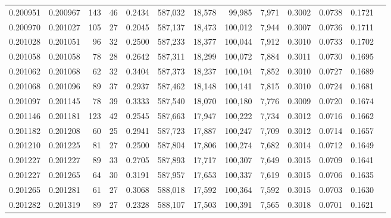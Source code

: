 \begin{tabular}{rrrrrrrrrrrrr}
0.200951 & 0.200967 &   143 &  46 &                                     0.2434 & 587,032 &  18,578 &  99,985 &   7,971 & 0.3002 & 0.0738 & 0.1721 \\
0.200970 & 0.201027 &   105 &  27 &                                     0.2045 & 587,137 &  18,473 & 100,012 &   7,944 & 0.3007 & 0.0736 & 0.1711 \\
0.201028 & 0.201051 &    96 &  32 &                                     0.2500 & 587,233 &  18,377 & 100,044 &   7,912 & 0.3010 & 0.0733 & 0.1702 \\
0.201058 & 0.201058 &    78 &  28 &                                     0.2642 & 587,311 &  18,299 & 100,072 &   7,884 & 0.3011 & 0.0730 & 0.1695 \\
0.201062 & 0.201068 &    62 &  32 &                                     0.3404 & 587,373 &  18,237 & 100,104 &   7,852 & 0.3010 & 0.0727 & 0.1689 \\
0.201068 & 0.201096 &    89 &  37 &                                     0.2937 & 587,462 &  18,148 & 100,141 &   7,815 & 0.3010 & 0.0724 & 0.1681 \\
0.201097 & 0.201145 &    78 &  39 &                                     0.3333 & 587,540 &  18,070 & 100,180 &   7,776 & 0.3009 & 0.0720 & 0.1674 \\
0.201146 & 0.201181 &   123 &  42 &                                     0.2545 & 587,663 &  17,947 & 100,222 &   7,734 & 0.3012 & 0.0716 & 0.1662 \\
0.201182 & 0.201208 &    60 &  25 &                                     0.2941 & 587,723 &  17,887 & 100,247 &   7,709 & 0.3012 & 0.0714 & 0.1657 \\
0.201210 & 0.201225 &    81 &  27 &                                     0.2500 & 587,804 &  17,806 & 100,274 &   7,682 & 0.3014 & 0.0712 & 0.1649 \\
0.201227 & 0.201227 &    89 &  33 &                                     0.2705 & 587,893 &  17,717 & 100,307 &   7,649 & 0.3015 & 0.0709 & 0.1641 \\
0.201227 & 0.201265 &    64 &  30 &                                     0.3191 & 587,957 &  17,653 & 100,337 &   7,619 & 0.3015 & 0.0706 & 0.1635 \\
0.201265 & 0.201281 &    61 &  27 &                                     0.3068 & 588,018 &  17,592 & 100,364 &   7,592 & 0.3015 & 0.0703 & 0.1630 \\
0.201282 & 0.201319 &    89 &  27 &                                     0.2328 & 588,107 &  17,503 & 100,391 &   7,565 & 0.3018 & 0.0701 & 0.1621 \\

\end{tabular}
